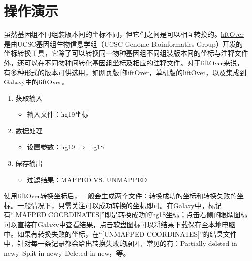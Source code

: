 \section{操作演示}
虽然基因组不同组装版本间的坐标不同，但它们之间是可以相互转换的。\href{http://genome.ucsc.edu/cgi-bin/hgLiftOver}{liftOver} 是由UCSC基因组生物信息学组（UCSC Genome Bioinformatics Group）开发的坐标转换工具，它除了可以转换同一物种基因组不同组装版本间的坐标与注释文件外，还可以在不同物种间转化基因组坐标及相应的注释文件。对于liftOver来说，有多种形式的版本可供选用，如\href{http://genome.ucsc.edu/cgi-bin/hgLiftOver}{网页版的liftOver}，\href{http://hgdownload.cse.ucsc.edu/downloads.html\#source\_downloads}{单机版的liftOver}，以及集成到Galaxy中的liftOver。
\begin{enumerate}
		\item 获取输入
			\begin{itemize}
				\item 输入文件：hg19坐标
			\end{itemize}
		\item 数据处理
			\begin{itemize}
				\item 设置参数：hg19 $\Rightarrow$ hg18
			\end{itemize}
		\item 保存输出
			\begin{itemize}
				\item 过滤结果：MAPPED VS. UNMAPPED
			\end{itemize}
\end{enumerate}

使用liftOver转换坐标后，一般会生成两个文件：转换成功的坐标和转换失败的坐标。一般情况下，只需关注可以成功转换的坐标即可。在Galaxy中，标记有“[MAPPED COORDINATES]”即是转换成功的hg18坐标；点击右侧的眼睛图标可以直接在Galaxy中查看结果，点击软盘图标可以将结果下载保存至本地电脑中。如果有转换失败的坐标，在“[UNMAPPED COORDINATES]”的结果文件中，针对每一条记录都会给出转换失败的原因，常见的有：Partially deleted in new，Split in new，Deleted in new，等。

